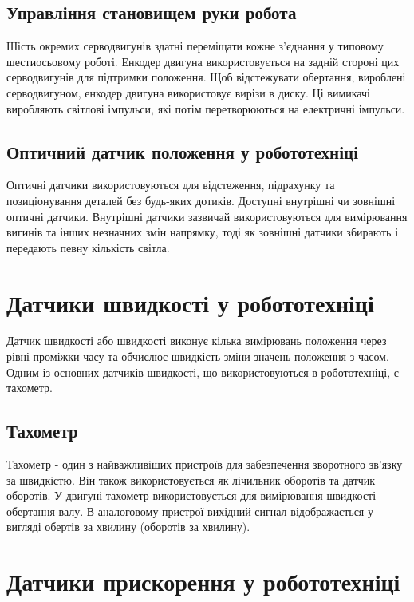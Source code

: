 \documentclass[a4paper,14pt]{extreport}
\begin{document}
 \subsection{Управління становищем руки робота}
Шість окремих серводвигунів здатні переміщати кожне з'єднання у типовому шестиосьовому роботі. Енкодер двигуна використовується на задній стороні цих серводвигунів для підтримки положення. Щоб відстежувати обертання, вироблені серводвигуном, енкодер двигуна використовує вирізи в диску. Ці вимикачі виробляють світлові імпульси, які потім перетворюються на електричні імпульси.

 \subsection{Оптичний датчик положення у робототехніці}
Оптичні датчики використовуються для відстеження, підрахунку та позиціонування деталей без будь-яких дотиків. Доступні внутрішні чи зовнішні оптичні датчики. Внутрішні датчики зазвичай використовуються для вимірювання вигинів та інших незначних змін напрямку, тоді як зовнішні датчики збирають і передають певну кількість світла.

\section{Датчики швидкості у робототехніці}\par

Датчик швидкості або швидкості виконує кілька вимірювань положення через рівні проміжки часу та обчислює швидкість зміни значень положення з часом. Одним із основних датчиків швидкості, що використовуються в робототехніці, є тахометр.

 \subsection{Тахометр}
Тахометр - один з найважливіших пристроїв для забезпечення зворотного зв'язку за швидкістю. Він також використовується як лічильник оборотів та датчик оборотів. У двигуні тахометр використовується для вимірювання швидкості обертання валу. В аналоговому пристрої вихідний сигнал відображається у вигляді обертів за хвилину (оборотів за хвилину).


\section{Датчики прискорення у робототехніці}\par
\end{document}
